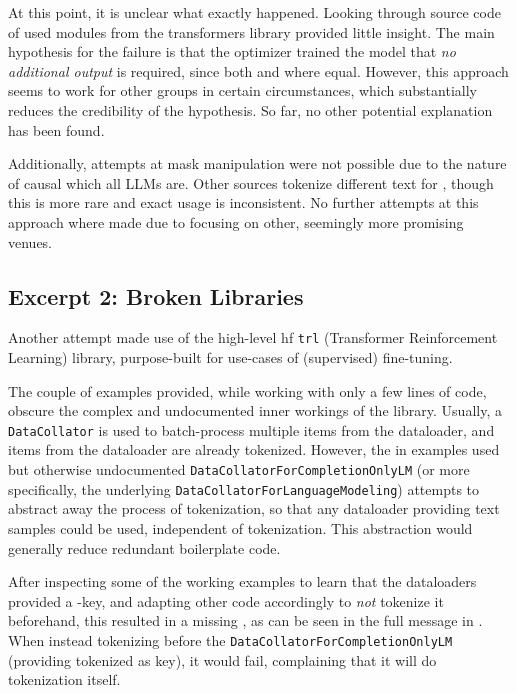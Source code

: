 At this point, it is unclear what exactly happened.
Looking through source code of used modules from the \gls{transformers} library provided little insight.
The main hypothesis for the failure is that the optimizer trained the model that \textit{no additional output} is required, since both  and  where equal.
However, this approach seems to work for other groups in certain circumstances, which substantially reduces the credibility of the hypothesis.
So far, no other potential explanation has been found.

Additionally, attempts at mask manipulation were not possible due to the nature of \gls{causal} which all \glspl{LLM} are.
Other sources tokenize different text for , though this is more rare and exact usage is inconsistent.
No further attempts at this approach where made due to focusing on other, seemingly more promising venues.


\subsection{Excerpt 2: Broken Libraries}\label{sub:libraries}
Another attempt made use of the high-level \gls{hf} \texttt{trl} (Transformer Reinforcement Learning) library, purpose-built for use-cases of (supervised) fine-tuning.

\begin{sloppypar}
The couple of examples provided, while working with only a few lines of code, obscure the complex and undocumented inner workings of the library.
Usually, a \texttt{DataCollator} is used to batch-process multiple items from the dataloader, and items from the dataloader are already tokenized.
However, the in examples used but otherwise undocumented \texttt{DataCollatorForCompletionOnlyLM} (or more specifically, the underlying \texttt{DataCollatorForLanguageModeling}) attempts to abstract away the process of tokenization, so that any dataloader providing text samples could be used, independent of tokenization.
This abstraction would generally reduce redundant boilerplate code.
\end{sloppypar}


\begin{sloppypar}
After inspecting some of the working examples to learn that the dataloaders provided a -key, and adapting other code accordingly to \textit{not} tokenize it beforehand, this resulted in a  missing , as can be seen in the full message in .
When instead tokenizing before the \texttt{DataCollatorForCompletionOnlyLM} (providing tokenized  as key), it would fail, complaining that it will do tokenization itself.
\end{sloppypar}


